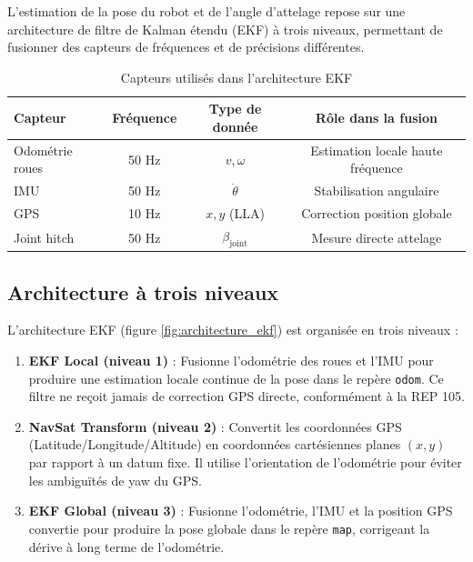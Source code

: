 \documentclass[a4paper,12pt]{report}
\begin{document}
L'estimation de la pose du robot et de l'angle d'attelage repose sur une architecture de filtre de Kalman étendu (EKF) à trois niveaux, permettant de fusionner des capteurs de fréquences et de précisions différentes.

\begin{table}[htbp]
    \centering
    \begin{tabular}{lccc}
        \toprule
        Capteur & Fréquence & Type de donnée & Rôle dans la fusion \\
        \midrule
        Odométrie roues & 50 Hz & $v, \omega$ & Estimation locale haute fréquence \\
        IMU & 50 Hz & $\dot{\theta}$ & Stabilisation angulaire \\
        GPS & 10 Hz & $x, y$ (LLA) & Correction position globale \\
        Joint hitch & 50 Hz & $\beta_{\text{joint}}$ & Mesure directe attelage \\
        \bottomrule
    \end{tabular}
    \caption{Capteurs utilisés dans l'architecture EKF}
    \label{tab:capteurs_ekf}
\end{table}

\subsection{Architecture à trois niveaux}
\label{subsec:architecture_3_niveaux}

L'architecture EKF (figure \ref{fig:architecture_ekf}) est organisée en trois niveaux :

\begin{enumerate}
    \item \textbf{EKF Local (niveau 1)} : Fusionne l'odométrie des roues et l'IMU pour produire une estimation locale continue de la pose dans le repère \texttt{odom}. Ce filtre ne reçoit jamais de correction GPS directe, conformément à la REP 105.
    
    \item \textbf{NavSat Transform (niveau 2)} : Convertit les coordonnées GPS (Latitude/Longitude/Altitude) en coordonnées cartésiennes planes $(x, y)$ par rapport à un datum fixe. Il utilise l'orientation de l'odométrie pour éviter les ambiguïtés de yaw du GPS.
    
    \item \textbf{EKF Global (niveau 3)} : Fusionne l'odométrie, l'IMU et la position GPS convertie pour produire la pose globale dans le repère \texttt{map}, corrigeant la dérive à long terme de l'odométrie.
\end{enumerate}
\end{document}
